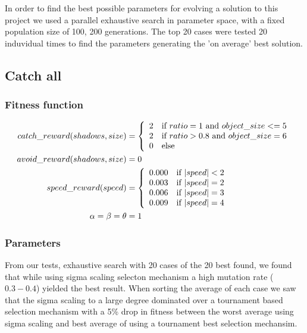 \documentclass[12pt]{article}
\begin{document}
In order to find the best possible parameters for evolving a solution to this project we used a parallel exhaustive search in parameter space, with a fixed population size of 100, 200 generations. The top 20 cases were tested 20 induvidual times to find the parameters generating the 'on average' best solution. 
	\subsection{Catch all}
		\subsubsection{Fitness function}\label{sec:fitness1}
			\begin{align}
				catch\_reward(shadows, size) &= \left\{ 
				\begin{array}{l l}
					2 &\text{if $ratio=1$ and $object\_size <= 5$} \\
					2 &\text{if $ratio>0.8$ and $object\_size = 6$}\\
					0 &\text{else}
       \end{array} \right.\nonumber\\
				avoid\_reward(shadows, size) &= 0\nonumber\\
				speed\_reward(speed) &= \left\{ 
				\begin{array}{l l}
					0.000 &\text{if $|speed| < 2$} \\
					0.003 &\text{if $|speed| = 2$} \\
					0.006 &\text{if $|speed| = 3$} \\
					0.009 &\text{if $|speed| = 4$} \\
       \end{array} \right.\nonumber\\
			 \alpha =\beta =\theta &= 1\nonumber
			\end{align}
		\subsubsection{Parameters}
			From our tests, exhaustive search with 20 cases of the 20 best found, we found that while using sigma scaling selecton mechanism a high mutation rate ($0.3-0.4$) yielded the best result. When sorting the average of each case we saw that the sigma scaling to a large degree dominated over a tournament based selection mechanism with a 5\% drop in fitness between the worst average using sigma scaling and best average of using a tournament best selection mechansim.
\end{document}
